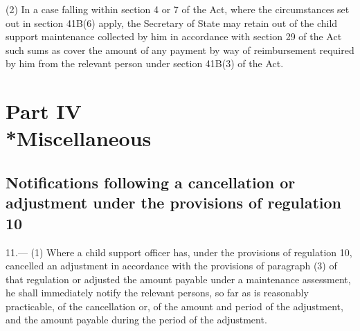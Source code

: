 \documentclass[12pt,a4paper]{article}
\begin{document}
(2) In a case falling within section 4 or 7 of the Act, where the circumstances set out in section 41B(6) apply, the Secretary of State may retain out of the child support maintenance collected by him in accordance with section 29 of the Act such sums as cover the amount of any payment by way of reimbursement required by him from the relevant person under section 41B(3) of the Act.


\section[Part IV --- Miscellaneous]{Part IV\\*Miscellaneous}

\renewcommand\parthead{--- Part IV}

\subsection[11. Notifications following a cancellation or adjustment under the provisions of regulation 10]{Notifications following a cancellation or adjustment under the provisions of regulation 10}

11.—%
(1) Where a child support officer has, under the provisions of regulation 10, cancelled an adjustment in accordance with the provisions of paragraph (3) of that regulation or adjusted the amount payable under a maintenance assessment, he shall immediately notify the relevant persons, so far as is reasonably practicable, of the cancellation or, of the amount and period of the adjustment, and the amount payable during the period of the adjustment.
\end{document}
